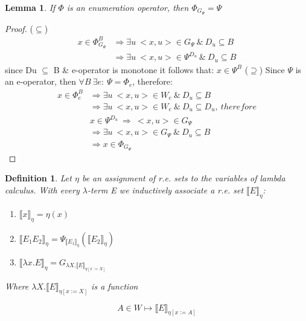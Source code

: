 \documentclass{article}
\newtheorem{lemma}[theorem]{Lemma} %
\newtheorem{definition}{Definition}[section] %
\begin{document}
	\begin{lemma}
		If $\Phi$ is an enumeration operator, then $\Phi_{G_{\Psi}} = \Psi$
	\end{lemma}	
	\begin{proof}
		($\subseteq$)
		\begin{equation*}
		\begin{split}
			x \in \Phi_{G_\Psi}^B &\Rightarrow \exists u \: 
				<x, u> \in G_\Psi \:\&\: D_u \subseteq B\\
			&\Rightarrow \exists u \: 
				<x, u> \in \Psi^{D_u} \:\&\: D_u \subseteq B 
		\end{split}
		\end{equation*}
		\qquad since Du $\subseteq$ B \& e-operator is monotone 
		it follows that: $x \in \Psi^B$
		\newline
		($\supseteq$)
		\newline
		Since $\Psi$ is an e-operator, then 
		$\forall B \: \exists e:\: \Psi = \Phi_e$, therefore:
		\begin{equation*}
		\begin{split}
			x \in \Phi_e^B &\Rightarrow \exists u \: 
				<x, u> \in W_e \:\&\: D_u \subseteq B\\
			&\Rightarrow \exists u \: 
				<x, u> \in W_e \:\&\: D_u \subseteq D_u,\:therefore\\
			&x \in \Psi^{D_u} \:\Rightarrow\: <x, u> \in G_\Psi\\
			&\Rightarrow \exists u \: 
				<x, u> \in G_\Psi \:\&\: D_u \subseteq B\\
			&\Rightarrow x \in \Phi_{G_\Psi}
		\end{split}
		\end{equation*}

	\end{proof}


	\begin{definition}
		Let $\eta$ be an assignment of r.e. sets to the variables of 
		lambda calculus. With every $\lambda$-term E we inductively 
		associate a r.e. set $\llbracket E \rrbracket_{\eta}$:
			\begin{enumerate}
				\item $\llbracket x \rrbracket_{\eta} = \eta (x)$
				\item $\llbracket E_1 E_2 \rrbracket_{\eta} = 
					\Psi_{\llbracket E_1 \rrbracket_\eta} 
					(\llbracket E_2 \rrbracket_\eta)$
				\item $\llbracket \lambda x.E \rrbracket_{\eta} = 
					G_{\lambda X. \llbracket E \rrbracket_{\eta [x := X]}}$
			\end{enumerate}
			Where $\lambda X. \llbracket E \rrbracket_{\eta [x := X]}$ is a function

		\begin{equation}
			A \in W \mapsto \llbracket E \rrbracket_{\eta [x := A]}
		\end{equation}
	\end{definition}
\end{document}
